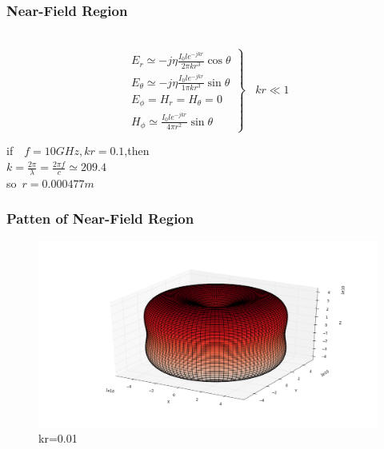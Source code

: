 \documentclass[compress=true]{beamer}
\begin{document}
\begin{frame}
  \frametitle{Near-Field Region}
\begin{block}{~}
  \begin{equation}
    \left.
      \begin{array}{l}
        E_r \simeq -j{\eta}\frac{I_0le^{-jkr}}{2\pi kr^3}\cos{\theta}\\
        E_{\theta} \simeq -j{\eta}\frac{I_0le^{-jkr}}{1\pi kr^3}\sin{\theta}\\
        E_{\phi}=H_r=H_{\theta}=0\\
        H_{\phi}\simeq \frac{I_0le^{-jkr}}{4\pi r^2}\sin{\theta}
      \end{array}
    \right\}~~~~ kr\ll 1
  \end{equation}
\end{block}
\begin{center}
if~~$f=10GHz,kr=0.1$,then\\
$k=\frac{2\pi}{\lambda}=\frac{2\pi f}{c}\simeq 209.4$\\
so~$r=0.000477 m$
\end{center}
\end{frame}
\begin{frame}
  \frametitle{Patten of Near-Field Region}
  \begin{figure}
    \includegraphics[height=0.68\textheight]{near_kr_0_01_1.png}
    \caption*{\tiny{kr=0.01}}
  \end{figure}
\end{frame}
\end{document}
